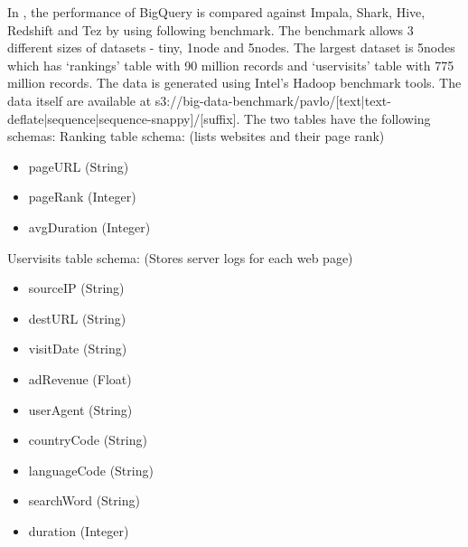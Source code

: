 \documentclass[9pt,twocolumn,twoside]{../../styles/osajnl}
\begin{document}
\noindent
In \cite{www-benchmarks-bigguery}, the performance of BigQuery is
compared against Impala, Shark, Hive, Redshift and Tez by using
following benchmark. The benchmark allows 3 different sizes of
datasets - tiny, 1node and 5nodes. The largest dataset is 5nodes which
has ‘rankings’ table with 90 million records and ‘uservisits’ table
with 775 million records. The data is generated using Intel's Hadoop
benchmark tools. The data itself are available at
s3://big-data-benchmark/pavlo/[text|text-deflate|sequence|sequence-snappy]/[suffix]. The
two tables have the following schemas:\newline \newline
\noindent
Ranking table schema: (lists websites and their page rank)
\begin{itemize}[noitemsep,topsep=0pt] \item pageURL (String) \item pageRank (Integer) \item avgDuration (Integer) \newline
\end{itemize}
\noindent
Uservisits table schema: (Stores server logs for each web page)
\begin{itemize}[noitemsep,topsep=0pt] \item sourceIP (String) \item destURL (String) \item visitDate (String) \item adRevenue (Float) \item userAgent (String) \item countryCode (String) \item languageCode (String) \item searchWord (String) \item duration (Integer) \newline
\end{itemize}
\end{document}
